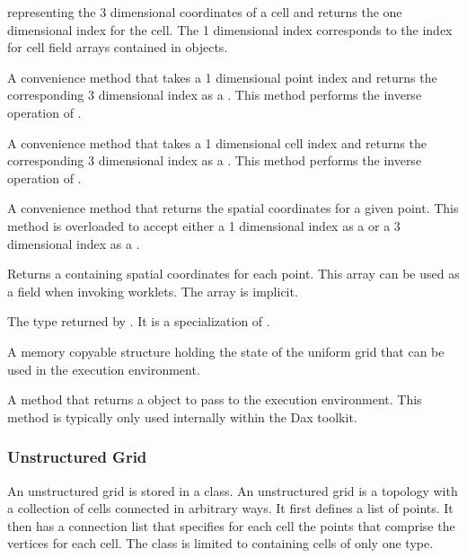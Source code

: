 \begin{description}
   representing the 3 dimensional coordinates of a cell and
  returns the one dimensional index for the cell. The 1 dimensional index
  corresponds to the index for cell field arrays contained in
   objects.
\item[\textcode{ComputePointLocation}] A convenience method that takes a 1
  dimensional point index and returns the corresponding 3 dimensional index
  as a . This method performs the inverse operation of
  .
\item[\textcode{ComputeCellLocation}] A convenience method that takes a 1
  dimensional cell index and returns the corresponding 3 dimensional index
  as a . This method performs the inverse operation of
  .
\item[\textcode{ComputePointCoordinates}] A convenience method that
  returns the spatial coordinates for a given point. This method is
  overloaded to accept either a 1 dimensional index as a  or a 3
  dimensional index as a .
\item[\textcode{GetPointCoordinates}] Returns a 
  containing spatial coordinates for each point. This array can be used as
  a field when invoking worklets. The array is implicit.
\item[\textcode{PointCoordinatesType}] The type returned by
  . It is a specialization of
  .
\item[\textcode{TopologyStructConstExecution}] A memory copyable structure
  holding the state of the uniform grid that can be used in the execution
  environment.
\item[\textcode{PrepareForInput}] A method that returns a
   object to pass to the execution
  environment. This method is typically only used internally within the Dax
  toolkit.
\end{description}


\subsubsection{Unstructured Grid}


An unstructured grid is stored in a  class. An
unstructured grid is a topology with a collection of cells connected in
arbitrary ways. It first defines a list of points. It then has a connection
list that specifies for each cell the points that comprise the vertices for
each cell. The  class is limited to containing
cells of only one type.

